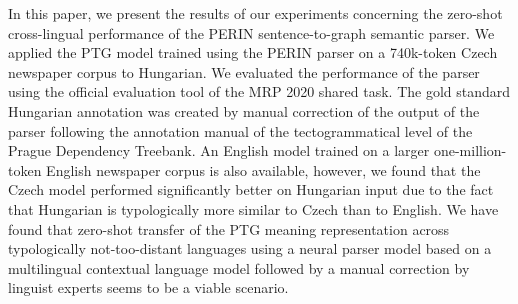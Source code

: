 In this paper, we present the results of our experiments concerning the zero-shot cross-lingual performance of the PERIN sentence-to-graph semantic parser. We applied the PTG model trained using the PERIN parser on a 740k-token Czech newspaper corpus to Hungarian. We evaluated the performance of the parser using the official evaluation tool of the MRP 2020 shared task. The gold standard Hungarian annotation was created by manual correction of the output of the parser following the annotation manual of the tectogrammatical level of the Prague Dependency Treebank. An English model trained on a larger one-million-token English newspaper corpus is also available, however, we found that the Czech model performed significantly better on Hungarian input due to the fact that Hungarian is typologically more similar to Czech than to English. We have found that zero-shot transfer of the PTG meaning representation across typologically not-too-distant languages using a neural parser model based on a multilingual contextual language model followed by a manual correction by linguist experts seems to be a viable scenario.

